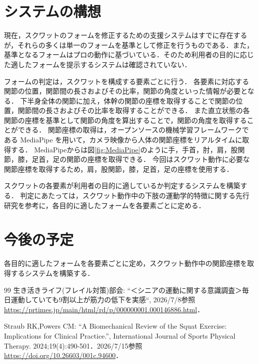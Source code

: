 \documentclass[twocolumn,10pt,a4j]{ltjsarticle}
\begin{document}
\section{システムの構想}
現在，スクワットのフォームを修正するための支援システムはすでに存在するが，それらの多くは単一のフォームを基準として修正を行うものである．また，基準となるフォームはプロの動作に基づいている．そのため利用者の目的に応じた適したフォームを提示するシステムは確認されていない．

フォームの判定は，スクワットを構成する要素ごとに行う．
各要素に対応する関節の位置，関節間の長さおよびその比率，関節の角度といった情報が必要となる．
下半身全体の関節に加え，体幹の関節の座標を取得することで関節の位置，関節間の長さおよびその比率を取得することができる．
また直立状態の各関節の座標を基準として関節の角度を算出することで，関節の角度を取得することができる．
関節座標の取得は，オープンソースの機械学習フレームワークである MediaPipe を用いて，カメラ映像から人体の関節座標をリアルタイムに取得する．
MediaPipeからは図\ref{fig:MediaPipe}のように手，手首，肘，肩，股関節，膝，足首，足の関節の座標を取得できる．
今回はスクワット動作に必要な関節座標を取得するため，肩，股関節，膝，足首，足の座標を使用する．

スクワットの各要素が利用者の目的に適しているか判定するシステムを構築する．
判定にあたっては，スクワット動作中の下肢の運動学的特徴に関する先行研究\cite{squat}を参考に，各目的に適したフォームを各要素ごとに定める．

\section{今後の予定}
各目的に適したフォームを各要素ごとに定め，スクワット動作中の関節座標を取得するシステムを構築する．

\begin{thebibliography}{99}
 生き活きライフ(フレイル対策)部会: ``＜シニアの運動に関する意識調査＞毎日運動していても9割以上が筋力の低下を実感``, 2026/7/8参照
\url{https://prtimes.jp/main/html/rd/p/000000001.000146886.html}．

 Straub RK,Powers CM: ``A Biomechanical Review of the Squat Exercise: Implications for Clinical Practice.'', International Journal of Sports Physical Therapy. 2024;19(4):490-501．2026/7/15参照
\url{https://doi.org/10.26603/001c.94600}．

\end{thebibliography}
 
\end{document}
